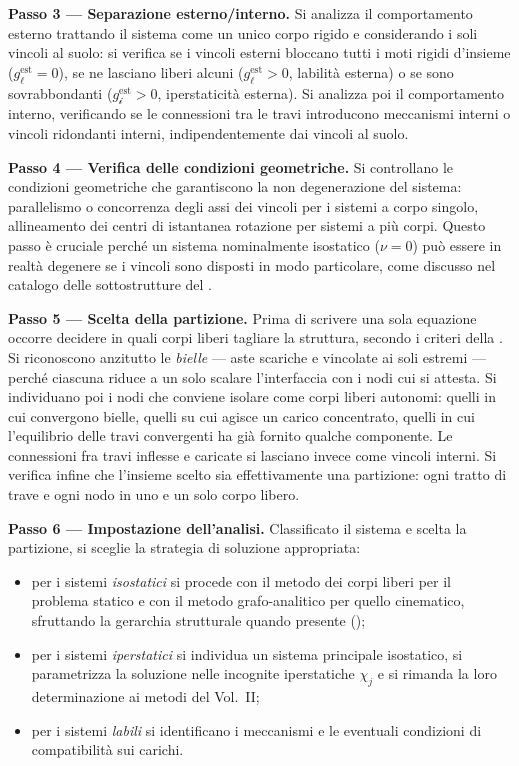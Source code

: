 \medskip
\noindent\textbf{Passo 3 — Separazione esterno/interno.}
Si analizza il comportamento esterno trattando il sistema
come un unico corpo rigido e considerando i soli vincoli
al suolo: si verifica se i vincoli esterni bloccano
tutti i moti rigidi d'insieme ($g_\ell^{\text{est}} = 0$),
se ne lasciano liberi alcuni ($g_\ell^{\text{est}} > 0$,
labilità esterna) o se sono sovrabbondanti
($g_{\mathscr{i}}^{\text{est}} > 0$, iperstaticità
esterna). Si analizza poi il comportamento interno,
verificando se le connessioni tra le travi introducono
meccanismi interni o vincoli ridondanti interni,
indipendentemente dai vincoli al suolo.

\medskip
\noindent\textbf{Passo 4 — Verifica delle condizioni
	geometriche.}
Si controllano le condizioni geometriche che garantiscono
la non degenerazione del sistema: parallelismo o
concorrenza degli assi dei vincoli per i sistemi a
corpo singolo, allineamento dei centri di istantanea
rotazione per sistemi a più corpi. Questo passo è
cruciale perché un sistema nominalmente isostatico
($\nu = 0$) può essere in realtà degenere se i vincoli
sono disposti in modo particolare, come discusso nel
catalogo delle sottostrutture del
.

\medskip
\noindent\textbf{Passo 5 — Scelta della partizione.}
Prima di scrivere una sola equazione occorre decidere in
quali corpi liberi tagliare la struttura, secondo i criteri
della . Si riconoscono anzitutto le
\emph{bielle} --- aste scariche e vincolate ai soli
estremi --- perché ciascuna riduce a un solo scalare
l'interfaccia con i nodi cui si attesta. Si individuano poi
i nodi che conviene isolare come corpi liberi autonomi:
quelli in cui convergono bielle, quelli su cui agisce un
carico concentrato, quelli in cui l'equilibrio delle travi
convergenti ha già fornito qualche componente. Le
connessioni fra travi inflesse e caricate si lasciano invece
come vincoli interni. Si verifica infine che l'insieme
scelto sia effettivamente una partizione: ogni tratto di
trave e ogni nodo in uno e un solo corpo libero.

\medskip
\noindent\textbf{Passo 6 — Impostazione dell'analisi.}
Classificato il sistema e scelta la partizione, si sceglie la strategia di soluzione appropriata:
\begin{itemize}[noitemsep]
	\item per i sistemi \emph{isostatici} si procede
	con il metodo dei corpi liberi per il problema
	statico e con il metodo grafo-analitico per
	quello cinematico, sfruttando la gerarchia
	strutturale quando presente
	();
	\item per i sistemi \emph{iperstatici} si
	individua un sistema principale isostatico,
	si parametrizza la soluzione nelle incognite
	iperstatiche $\chi_j$ e si rimanda la loro
	determinazione ai metodi del Vol.~II;
	\item per i sistemi \emph{labili} si identificano
	i meccanismi e le eventuali condizioni di
	compatibilità sui carichi.
\end{itemize}

